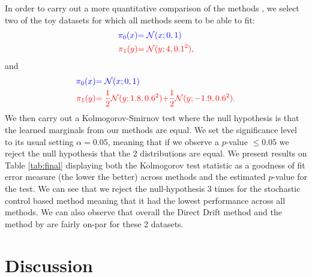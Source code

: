 \documentclass[a4paper,12pt,twoside,openright]{report}
\theoremstyle{definition}
\begin{document}
In order to carry out a more quantitative comparison of the methods , we select two of the toy datasets for which all methods seem to be able to fit:
\begin{align*}
\color{blue}{\pi_0(x)} &\color{blue}{= {\mathcal{N}}(x; 0,  1)} \\
    \color{red}{\pi_1(y)} &\color{red}{= {\mathcal{N}}(y; 4, 0.1^2)} ,
\end{align*}
and
\begin{align*}
     \color{blue}{\pi_0(x)} &\color{blue}{= {\mathcal{N}}(x; 0,  1)} \\
    \color{red}{\pi_1(y)} &\color{red}{= \frac{1}{2}{\mathcal{N}}(y; 1.8, 0.6 ^2)}\color{red}{ + \frac{1}{2}{\mathcal{N}}(y; -1.9, 0.6 ^2) }.
\end{align*}
We then carry out a Kolmogorov-Smirnov \citep{kolmogorov1933sulla} test where the null hypothesis is that the learned marginals from our methods are equal. We set the significance level to its usual setting  $\alpha=0.05$, meaning that if we observe a $p$-value $\leq 0.05$ we reject the null hypothesis that the 2 distributions are equal. We present results on Table \ref{tab:final} displaying both the Kolmogorov test statistic as a goodness of fit error measure (the lower the better) across methods and the estimated $p$-value for the test. We can see that we reject the null-hypothesis 3 times for the stochastic control based method meaning that it had the lowest performance across all methods. We can also observe that overall the Direct Drift method and the method by \cite{pavon2018data} are fairly on-par for these 2 datasets.
\chapter{Discussion}


\appendix
\singlespacing

 
 
\end{document}
